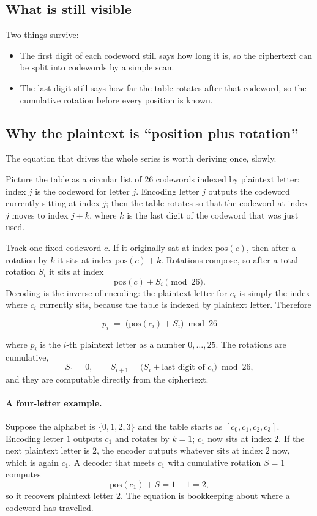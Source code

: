 \documentclass[11pt]{article}
\begin{document}
\subsection{What is still visible}

Two things survive:

\begin{itemize}
  \item The first digit of each codeword still says how long it is, so the
        ciphertext can be split into codewords by a simple scan.
  \item The last digit still says how far the table rotates after that
        codeword, so the cumulative rotation before every position is known.
\end{itemize}

\subsection{Why the plaintext is ``position plus rotation''}

The equation that drives the whole series is worth deriving once, slowly.

Picture the table as a circular list of 26 codewords indexed by plaintext
letter: index $j$ is the codeword for letter $j$.  Encoding letter $j$ outputs
the codeword currently sitting at index $j$; then the table rotates so that
the codeword at index $j$ moves to index $j+k$, where $k$ is the last digit of
the codeword that was just used.

Track one fixed codeword $c$.  If it originally sat at index
$\mathrm{pos}(c)$, then after a rotation by $k$ it sits at index
$\mathrm{pos}(c)+k$.  Rotations compose, so after a total rotation $S_i$ it
sits at index
\[
\mathrm{pos}(c) + S_i \pmod{26}.
\]
Decoding is the inverse of encoding: the plaintext letter for $c_i$ is simply
the index where $c_i$ currently sits, because the table is indexed by
plaintext letter.  Therefore

\begin{equation}\label{eq:p2}
\boxed{\;p_i \;=\; \bigl(\mathrm{pos}(c_i) + S_i\bigr)\bmod 26\;}
\end{equation}

where $p_i$ is the $i$-th plaintext letter as a number $0,\dots,25$.  The
rotations are cumulative,
\[
S_1 = 0, \qquad
S_{i+1} = \bigl(S_i + \text{last digit of } c_i\bigr) \bmod 26,
\]
and they are computable directly from the ciphertext.

\paragraph{A four-letter example.}  Suppose the alphabet is $\{0,1,2,3\}$ and
the table starts as $[c_0,c_1,c_2,c_3]$.  Encoding letter $1$ outputs $c_1$
and rotates by $k=1$; $c_1$ now sits at index $2$.  If the next plaintext
letter is $2$, the encoder outputs whatever sits at index $2$ now, which is
again $c_1$.  A decoder that meets $c_1$ with cumulative rotation $S=1$
computes
\[
\mathrm{pos}(c_1)+S = 1+1 = 2,
\]
so it recovers plaintext letter $2$.  The equation is bookkeeping about where
a codeword has travelled.
\end{document}
